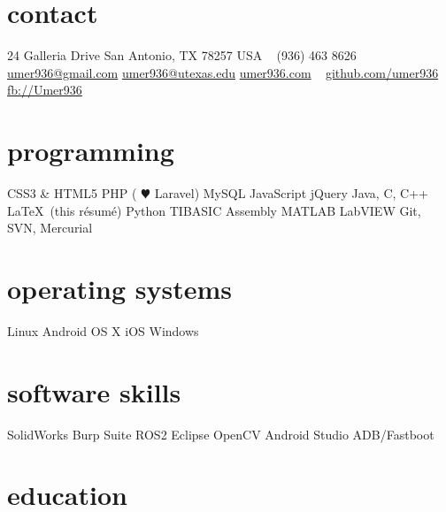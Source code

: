 \documentclass[]{friggeri-cv} %
\begin{document}


\begin{aside} %
	\section{contact}
	24 Galleria Drive
	San Antonio, TX 78257
	USA
	~
	(936) 463 8626
	~
	\href{mailto:umer936@gmail.com}{umer936@gmail.com}
	\href{mailto:umer936@utexas.edu}{umer936@utexas.edu}
	\href{http://umer936.com}{umer936.com}
	~
	\href{http://github.com/umer936}{github.com/umer936}
	\href{http://facebook.com/Umer936}{fb://Umer936}
	~
	\section{programming}
	CSS3 \& HTML5
	PHP ({\color{red} $\varheartsuit$} Laravel)
	MySQL
	JavaScript
	jQuery
	Java, C, C++
	\LaTeX \ (this r\'esum\'e)
	Python
	TIBASIC
	Assembly
	MATLAB
	LabVIEW
	Git, SVN, Mercurial
	~
	\section{operating systems}
	Linux
	Android
	OS X
	iOS
	Windows
	~
	\section{software skills}
	SolidWorks
	Burp Suite
	ROS2
	Eclipse
	OpenCV
	Android Studio
	ADB/Fastboot
\end{aside}


\section{education}
\vspace{-10pt}
\end{document}
